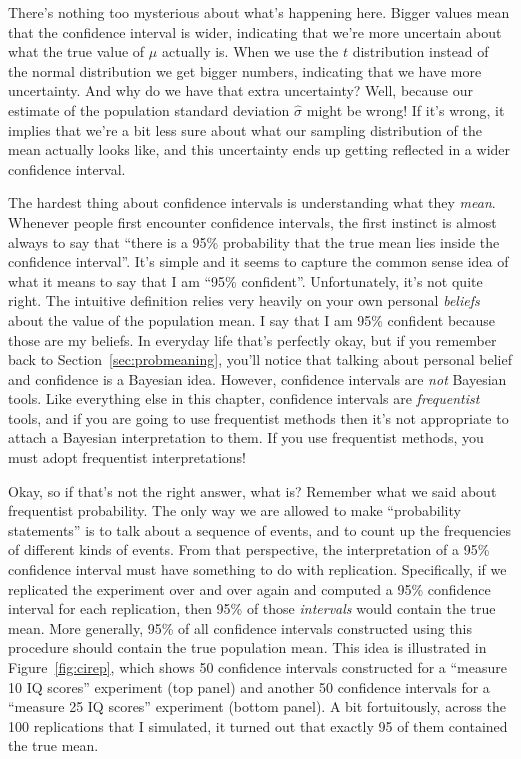 There's nothing too mysterious about what's happening here. Bigger values mean that the confidence interval is wider, indicating that we're more uncertain about what the true value of $\mu$ actually is. When we use the $t$ distribution instead of the normal distribution we get bigger numbers, indicating that we have more uncertainty. And why do we have that extra uncertainty? Well, because our estimate of the population standard deviation $\hat\sigma$ might be wrong! If it's wrong, it implies that we're a bit less sure about what our sampling distribution of the mean actually looks like, and this uncertainty ends up getting reflected in a wider confidence interval.  


The hardest thing about confidence intervals is understanding what they {\it mean}. Whenever people first encounter confidence intervals, the first instinct is almost always to say that ``there is a 95\% probability that the true mean lies inside the confidence interval''. It's simple and it seems to capture the common sense idea of what it means to say that I am ``95\% confident''. Unfortunately, it's not quite right. The intuitive definition relies very heavily on your own personal {\it beliefs} about the value of the population mean. I say that I am 95\% confident because those are my beliefs. In everyday life that's perfectly okay, but if you remember back to Section~\ref{sec:probmeaning}, you'll notice that talking about personal belief and confidence is a Bayesian idea. However, confidence intervals are {\it not} Bayesian tools. Like everything else in this chapter, confidence intervals are {\it frequentist} tools, and if you are going to use frequentist methods then it's not appropriate to attach a Bayesian interpretation to them. If you use frequentist methods, you must adopt frequentist interpretations!

Okay, so if that's not the right answer, what is? Remember what we said about frequentist probability. The only way we are allowed to make ``probability statements'' is to talk about a sequence of events, and to count up the frequencies of different kinds of events. From that perspective, the interpretation of a 95\% confidence interval must have something to do with replication. Specifically, if we replicated the experiment over and over again and computed a 95\% confidence interval for each replication, then 95\% of those {\it intervals} would contain the true mean. More generally, 95\% of all confidence intervals constructed using this procedure should contain the true population mean. This idea is illustrated in Figure~\ref{fig:cirep}, which shows 50 confidence intervals constructed for a ``measure 10 IQ scores'' experiment (top panel) and another 50 confidence intervals for a ``measure 25 IQ scores'' experiment (bottom panel). A bit fortuitously, across the 100 replications that I simulated, it turned out that exactly 95 of them contained the true mean. 

